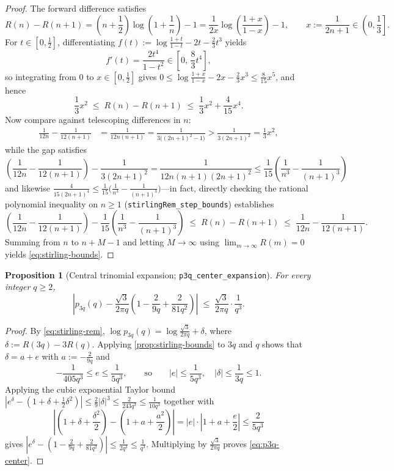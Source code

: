 \documentclass[11pt,a4paper]{article}
\numberwithin{equation}{section}
\theoremstyle{plain}
\newtheorem{proposition}[theorem]{Proposition}
\theoremstyle{definition}
\theoremstyle{remark}
\newcommand{\code}[1]{\texttt{\small #1}}
\begin{document}
\begin{proof}
The forward difference satisfies
\[
  R(n) - R(n+1) = \left(n+\frac{1}{2}\right)\log\!\left(1+\frac{1}{n}\right) - 1
  = \frac{1}{2x}\log\!\left(\frac{1+x}{1-x}\right) - 1,
  \qquad x := \frac{1}{2n+1}\in\left(0,\frac{1}{3}\right].
\]
For $t\in[0,\frac{1}{2}]$, differentiating $f(t):=\log\frac{1+t}{1-t}-2t-\frac{2}{3}t^3$ yields
\[
  f'(t) = \frac{2t^4}{1-t^2} \in \left[0,\,\frac{8}{3}t^4\right],
\]
so integrating from $0$ to $x\in[0,\frac{1}{2}]$ gives $0\le \log\frac{1+x}{1-x}-2x-\frac{2}{3}x^3 \le \frac{8}{15}x^5$, and hence
\[
  \frac{1}{3}x^2 \;\le\; R(n)-R(n+1) \;\le\; \frac{1}{3}x^2 + \frac{4}{15}x^4.
\]
Now compare against telescoping differences in $n$:
\begin{align*}
  \frac{1}{12n}-\frac{1}{12(n+1)} &= \frac{1}{12n(n+1)} = \frac{1}{3\bigl((2n+1)^2-1\bigr)} > \frac{1}{3(2n+1)^2} = \frac{1}{3}x^2,
\end{align*}
while the gap satisfies
\[
  \left(\frac{1}{12n}-\frac{1}{12(n+1)}\right) - \frac{1}{3(2n+1)^2}
  = \frac{1}{12n(n+1)(2n+1)^2} \le \frac{1}{15}\left(\frac{1}{n^3}-\frac{1}{(n+1)^3}\right)
\]
and likewise $\frac{4}{15(2n+1)^4} \le \frac{1}{15}\bigl(\frac{1}{n^3}-\frac{1}{(n+1)^3}\bigr)$---in fact, directly checking the rational polynomial inequality on $n\ge 1$ (\code{stirlingRem\_step\_bounds}) establishes
\[
  \left(\frac{1}{12n}-\frac{1}{12(n+1)}\right) - \frac{1}{15}\left(\frac{1}{n^3}-\frac{1}{(n+1)^3}\right)
  \;\le\; R(n) - R(n+1)
  \;\le\; \frac{1}{12n} - \frac{1}{12(n+1)}.
\]
Summing from $n$ to $n+M-1$ and letting $M\to\infty$ using $\lim_{m\to\infty} R(m)=0$ yields \eqref{eq:stirling-bounds}.
\end{proof}

\begin{proposition}[Central trinomial expansion; \code{p3q\_center\_expansion}]
\label{prop:p3q-center}
For every integer $q\ge 2$,
\begin{equation}\label{eq:p3q-center}
  \left|p_{3q}(q) - \frac{\sqrt{3}}{2\pi q}\left(1 - \frac{2}{9q} + \frac{2}{81q^2}\right)\right|
  \;\le\; \frac{\sqrt{3}}{2\pi q}\cdot\frac{1}{q^3}.
\end{equation}
\end{proposition}

\begin{proof}
By \eqref{eq:stirling-rem}, $\log p_{3q}(q) = \log\frac{\sqrt{3}}{2\pi q} + \delta$, where $\delta := R(3q) - 3R(q)$. Applying \cref{prop:stirling-bounds} to $3q$ and $q$ shows that $\delta = a + e$ with $a := -\frac{2}{9q}$ and
\[
  -\frac{1}{405q^3} \le e \le \frac{1}{5q^3},
  \qquad\text{so}\qquad |e|\le \frac{1}{5q^3},\quad |\delta|\le \frac{1}{3q} \le 1.
\]
Applying the cubic exponential Taylor bound $|e^\delta - (1+\delta+\frac{1}{2}\delta^2)|\le \frac{2}{9}|\delta|^3 \le \frac{2}{243q^3}\le \frac{1}{10q^3}$ together with
\[
  \left|\left(1+\delta+\frac{\delta^2}{2}\right) - \left(1+a+\frac{a^2}{2}\right)\right|
  = |e|\cdot\left|1+a+\frac{e}{2}\right| \le \frac{2}{5q^3}
\]
gives $|e^\delta - (1-\frac{2}{9q}+\frac{2}{81q^2})| \le \frac{1}{2q^3} \le \frac{1}{q^3}$. Multiplying by $\frac{\sqrt{3}}{2\pi q}$ proves \eqref{eq:p3q-center}.
\end{proof}
\end{document}

